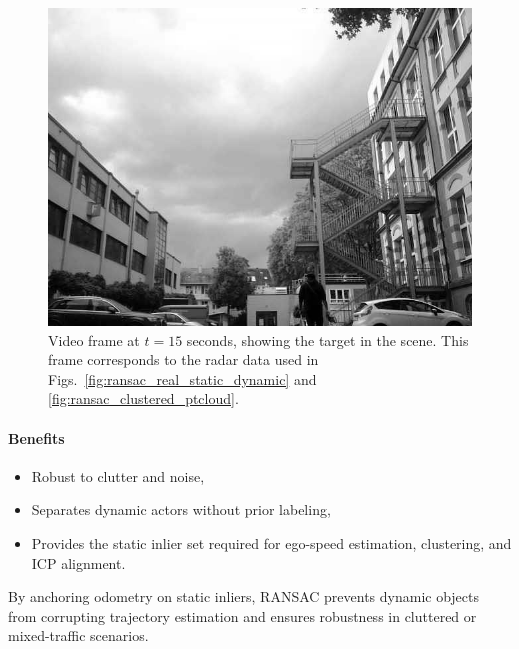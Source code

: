 \begin{figure}[!htbp]
    \centering
    \includegraphics[width=1.0\linewidth]{images/frame_15s.png}
    \caption{Video frame at $t=15$ seconds, showing the target in the scene. 
    This frame corresponds to the radar data used in Figs.~\ref{fig:ransac_real_static_dynamic} and \ref{fig:ransac_clustered_ptcloud}.}
    \label{fig:frame_15s_target}
\end{figure}

\paragraph*{Benefits}
\begin{itemize}
    \item Robust to clutter and noise,
    \item Separates dynamic actors without prior labeling,
    \item Provides the static inlier set required for ego-speed estimation, clustering, and ICP alignment.
\end{itemize}

By anchoring odometry on static inliers, RANSAC prevents dynamic objects from corrupting trajectory estimation and ensures robustness in cluttered or mixed-traffic scenarios.
